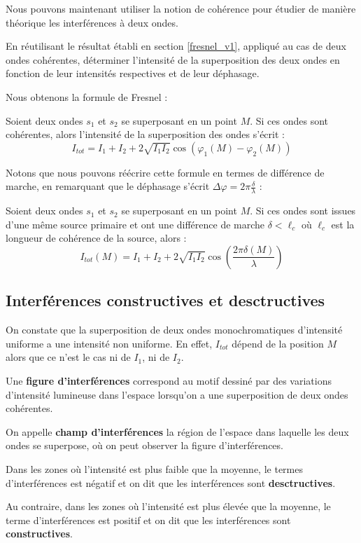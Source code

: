 \documentclass[11pt,fleqn]{book} %
\begin{document}
Nous pouvons maintenant utiliser la notion de cohérence pour étudier de manière théorique les interférences à deux ondes.
\begin{capex}
En réutilisant le résultat établi en section \ref{fresnel_v1}, appliqué au cas de deux ondes cohérentes, déterminer l'intensité de la superposition des deux ondes en fonction de leur intensités respectives et de leur déphasage.
\end{capex}
Nous obtenons la formule de Fresnel :
\begin{theorem}
	Soient deux ondes $s_1$ et $s_2$ se superposant en un point $M$. Si ces ondes sont cohérentes, alors l'intensité de la superposition des ondes s'écrit :
	\begin{equation}
		I_{tot} = I_1 + I_2 + 2 \sqrt{I_1 I_2} \cos(\varphi_1(M) - \varphi_2(M))
	\end{equation}
\end{theorem}

Notons que nous pouvons réécrire cette formule en termes de différence de marche, en remarquant que le déphasage s'écrit $\Delta \varphi = 2 \pi \frac{\delta}{\lambda}$ :

\begin{proposition}
	Soient deux ondes $s_1$ et $s_2$ se superposant en un point $M$. Si ces ondes sont issues d'une même source primaire et ont une différence de marche $\delta < \ell_c$ où $\ell_c$ est la longueur de cohérence de la source, alors :
	\begin{equation}
		I_{tot}(M) = I_1 + I_2 + 2 \sqrt{I_1 I_2} \cos\left(\frac{2 \pi \delta(M)}{\lambda}\right)
	\end{equation}
\end{proposition}

\subsection{Interférences constructives et desctructives}

On constate que la superposition de deux ondes monochromatiques d'intensité uniforme a une intensité non uniforme. En effet, $I_{tot}$ dépend de la position $M$ alors que ce n'est le cas ni de $I_1$, ni de $I_2$.

\begin{definition}
Une \textbf{figure d'interférences} correspond au motif dessiné par des variations d'intensité lumineuse dans l'espace lorsqu'on a une superposition de deux ondes cohérentes.

On appelle \textbf{champ d'interférences} la région de l'espace dans laquelle les deux ondes se superpose, où on peut observer la figure d'interférences.

Dans les zones où l'intensité est plus faible que la moyenne, le termes d'interférences est négatif et on dit que les interférences sont \textbf{desctructives}.

Au contraire, dans les zones où l'intensité est plus élevée que la moyenne, le terme d'interférences est positif et on dit que les interférences sont \textbf{constructives}.
\end{definition}
\end{document}
